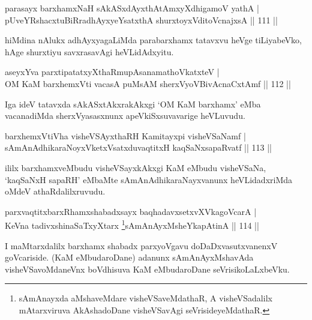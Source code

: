 
\begin{shl}
parasayx barxhamxNaH sAkASxdAyxthAtAmxyXdhigamoV yathA  | \\
pUveYRshacxtuBiRradhAyxyeYsatxthA shurxtoyxVditoV\s cnajxsA \hfill||  111 ||  
\end{shl}

\begin{artha}
hiMdina nAlukx adhAyxyagaLiMda parabarxhamx tatavxvu heVge tiLiyabeVko, hAge shurxtiyu savxrasavAgi heVLidAdxyitu.
\end{artha}

\begin{shl}
aseyxYva parxtipatatxyXthaRmupAsanamathoVkatxteV  | \\
OM KaM barxhemxVti vacasA puMsAM sherxVyoVBivAcnaCxtAmf \hfill||  112 ||  
\end{shl}

\begin{artha}
Iga ideV tatavxda sAkASxtAkxrakAkxgi `OM KaM barxhamx' eMba vacanadiMda sherxVyasasxnunx apeVkiSxsuvavarige heVLuvudu.
\end{artha}

\begin{shl}
barxhemxVtiVha visheVSAyxthaRH Kamitayxpi visheVSaNamf  | \\
sAmAnAdhikaraNoyxVketxVsatxduvaqtitxH kaqSaNxsapaRvatf  \hfill||  113 ||  
\end{shl}

\begin{artha}
ililx barxhamxveMbudu visheVSayxkAkxgi KaM eMbudu visheVSaNa, `kaqSaNxH sapaRH' eMbaMte sAmAnAdhikaraNayxvanunx heVLidadxriMda oMdeV athaRdalilxruvudu.
\end{artha}


\begin{shl}
parxvaqtitxbarxRhamxshabadxsayx baqhadavxsetxvXVkagoVcarA  | \\
KeVna tadivxshinaSaTxyXtarx \footnote{sAmAnayxda aMshaveMdare visheVSaveMdathaR, A visheVSadalilx mAtarxviruva AkAshadoDane visheVSavAgi seVrisideyeMdathaR.}sAmAnAyxMsheYkapAtinA \hfill||  114 ||  
\end{shl}

\begin{artha}
I maMtarxdalilx barxhamx shabadx parxyoVgavu doDaDxvasutxvanenxV goVcariside. (KaM eMbudaroDane) adanunx sAmAnAyxMshavAda visheVSavoMdaneVnx boVdhisuva KaM eMbudaroDane seVrisikoLaLxbeVku.
\end{artha}

